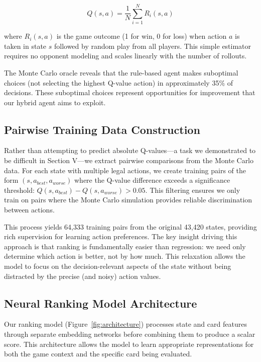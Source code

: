\documentclass[conference]{IEEEtran}
\begin{document}
\begin{equation}
Q(s, a) = \frac{1}{N} \sum_{i=1}^{N} R_i(s, a)
\end{equation}

where $R_i(s, a)$ is the game outcome (1 for win, 0 for loss) when action $a$ is taken in state $s$ followed by random play from all players. This simple estimator requires no opponent modeling and scales linearly with the number of rollouts.

The Monte Carlo oracle reveals that the rule-based agent makes suboptimal choices (not selecting the highest Q-value action) in approximately 35\% of decisions. These suboptimal choices represent opportunities for improvement that our hybrid agent aims to exploit.

\subsection{Pairwise Training Data Construction}

Rather than attempting to predict absolute Q-values—a task we demonstrated to be difficult in Section V—we extract pairwise comparisons from the Monte Carlo data. For each state with multiple legal actions, we create training pairs of the form $(s, a_{best}, a_{worse})$ where the Q-value difference exceeds a significance threshold: $Q(s, a_{best}) - Q(s, a_{worse}) > 0.05$. This filtering ensures we only train on pairs where the Monte Carlo simulation provides reliable discrimination between actions.

This process yields 64,333 training pairs from the original 43,420 states, providing rich supervision for learning action preferences. The key insight driving this approach is that ranking is fundamentally easier than regression: we need only determine which action is better, not by how much. This relaxation allows the model to focus on the decision-relevant aspects of the state without being distracted by the precise (and noisy) action values.

\subsection{Neural Ranking Model Architecture}

Our ranking model (Figure~\ref{fig:architecture}) processes state and card features through separate embedding networks before combining them to produce a scalar score. This architecture allows the model to learn appropriate representations for both the game context and the specific card being evaluated.
\end{document}
